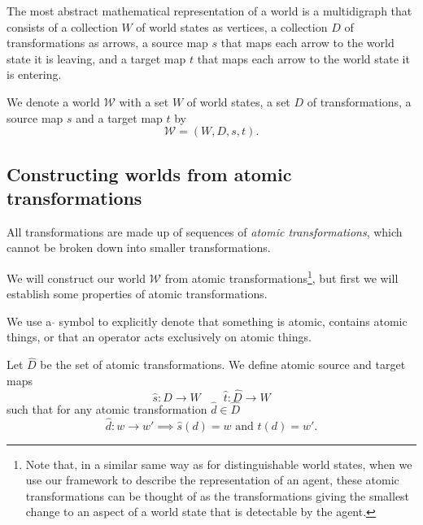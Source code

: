 \begin{postulate}
	The most abstract mathematical representation of a world is a multidigraph that consists of a collection $W$ of world states as vertices, a collection $D$ of transformations as arrows, a source map $s$ that maps each arrow to the world state it is leaving, and a target map $t$ that maps each arrow to the world state it is entering.
\end{postulate}

\begin{notation}
    We denote a world $\mathscr{W}$ with a set $W$ of world states, a set $D$ of transformations, a source map $s$ and a target map $t$ by
    \begin{equation}
        \mathscr{W} = (W, D, s, t).
    \end{equation}
\end{notation}

\subsection{Constructing worlds from atomic transformations}

\begin{postulate}
	All transformations are made up of sequences of \emph{atomic transformations}, which cannot be broken down into smaller transformations.
\end{postulate}

We will construct our world $\mathscr{W}$ from atomic transformations\footnote{
Note that, in a similar same way as for distinguishable world states, when we use our framework to describe the representation of an agent, these atomic transformations can be thought of as the transformations giving the smallest change to an aspect of a world state that is detectable by the agent.
}, but first we will establish some properties of atomic transformations.

\begin{notation}
    We use a $\hat{ }$ symbol to explicitly denote that something is atomic, contains atomic things, or that an operator acts exclusively on atomic things.
\end{notation}

Let $\hat{D}$ be the set of atomic transformations.
We define atomic source and target maps
\begin{equation}
	\hat{s}: \hat{D} \to W \quad\quad \hat{t}: \hat{D} \to W
\end{equation}
such that for any atomic transformation $\hat{d} \in \hat{D}$
\begin{equation}
	\hat{d}: w \to w' \implies \hat{s}(d) = w \text{ and } \hat{t}(d) = w'.
\end{equation}

